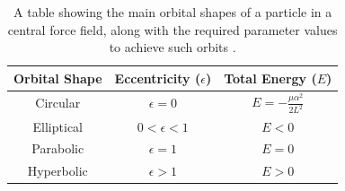 \documentclass[12pt]{article} %
\numberwithin{equation}{subsection} %
\begin{document}
	\begin{table}[h]
	\begin{center}
	\begin{tabular}{|c|c|c|}
	\hline
	\textbf{Orbital Shape}&\textbf{Eccentricity ($\epsilon$)}&\textbf{Total Energy ($E$)}\\
	\hline
	Circular&$\epsilon=0$&$E=-\frac{\mu \alpha^{2}}{2L^{2}}$\\
	Elliptical&$0<\epsilon<1$&$E<0$\\
	Parabolic&$\epsilon=1$&$E=0$\\
	Hyperbolic&$\epsilon>1$&$E>0$\\
	\hline
	\end{tabular}
	\captionsetup{justification=centering}
	\caption{A table showing the main orbital shapes of a particle in a central force field, along with the required parameter values to achieve such orbits \cite{curtis2013orbital}.}
	\label{tab: orbitShapes}
	\end{center}
	\end{table} \par

\FloatBarrier
\end{document}
